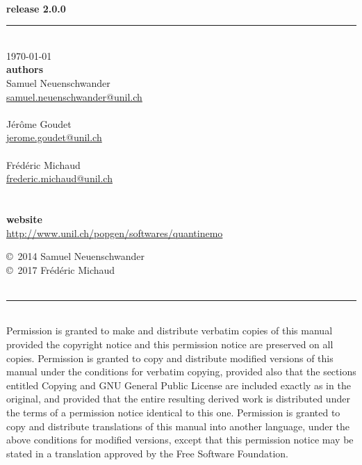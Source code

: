 \documentclass[letterpaper,12pt,oneside]{book}
\begin{document}
\begin{titlepage}
\begin{flushright}
\bfseries{}\\
\Large release 2.0.0
\end{flushright}
\noindent\rule{\linewidth}{1.5pt}

\\[40pt]
\today\\[20pt]
\textbf{authors}\\
Samuel Neuenschwander\\
\href{mailto:samuel.neuenschwander@unil.ch}{samuel.neuenschwander@unil.ch}\\
\\
J\'er\^ome Goudet\\
\href{mailto:jerome.goudet@unil.ch}{jerome.goudet@unil.ch}\\
\\
Fr\'ed\'eric Michaud \\
\href{mailto:frederic.michaud@unil.ch}{frederic.michaud@unil.ch}\\
\\
\\
\textbf{website}\\
\url{http://www.unil.ch/popgen/softwares/quantinemo}\\

\end{titlepage}

\copyright~2014 Samuel Neuenschwander\\
\copyright~2017 Fr\'ed\'eric Michaud \\\\
\noindent\rule{\linewidth}{1pt}\\
{\small Permission is granted to make and distribute verbatim copies of this manual provided the copyright notice and this permission notice are preserved on all copies. Permission is granted to copy and distribute modified versions of this manual under the conditions for verbatim copying, provided also that the sections entitled Copying and GNU General Public License are included exactly as in the original, and provided that the entire resulting derived work is distributed under the terms of a permission notice identical to this one. Permission is granted to copy and distribute translations of this manual into another language, under the above conditions for modified versions, except that this permission notice may be stated in a translation approved by the Free Software Foundation.}
\end{document}
